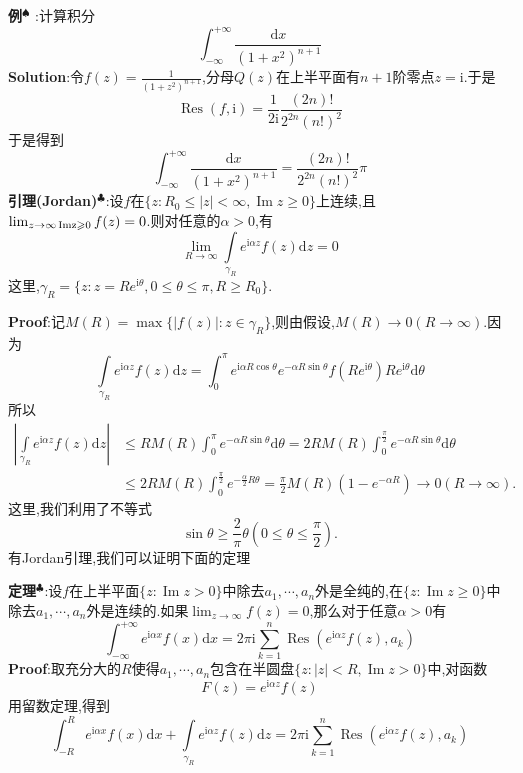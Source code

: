 \qquad \textbf{例}$^\spadesuit$ :计算积分
$$
\int_{-\infty}^{+\infty}\frac{\mathrm{d}x}{(1+x^2)^{n+1}}
$$
\qquad \textbf{Solution}:令$f(z)=\frac{1}{(1+z^2)^{n+1}}$,分母$Q(z)$在上半平面有$n+1$阶零点$z=\mathrm{i}$.于是
$$
\operatorname{Res}(f,\mathrm{i})=\frac{1}{2\mathrm{i}}\frac{(2n)!}{2^{2n}(n!)^2}
$$
于是得到
$$
\int_{-\infty}^{+\infty}\frac{\mathrm{d}x}{(1+x^2)^{n+1}}=\frac{(2n)!}{2^{2n}(n!)^2}\pi
$$
\qquad \textbf{引理(Jordan)}$^\clubsuit$:设$f$在$\{z:R_0\leqslant|z|<\infty,\operatorname{Im}z\geqslant 0\}$上连续,且$\lim_{z\to\infty\\\operatorname{Im z\geqslant 0}}f(z)=0$.则对任意的$\alpha>0$,有
$$
\lim_{R\to\infty}\int\limits_{\gamma_R}e^{\mathrm{i}\alpha z}f(z)\mathrm{d}z=0
$$
这里,$\gamma_R=\{z:z=Re^{\mathrm{i}\theta},0\leqslant\theta\leqslant \pi,R\geqslant R_0\}$.\par
\textbf{Proof}:记$M(R) = \max\{|f(z)|: z \in \gamma_R\}$,则由假设,$M(R) \to 0 (R \to \infty)$.因为
$$
\int\limits_{\gamma_R} e^{\mathrm{i}\alpha z} f(z) \mathrm{d}z = \int_0^\pi e^{\mathrm{i}\alpha R \cos\theta} e^{-\alpha R \sin\theta} f(R e^{\mathrm{i}\theta}) R e^{\mathrm{i}\theta} \mathrm{d}\theta
$$
所以
$$
\begin{aligned}
    \left|\int\limits_{\gamma_R} e^{\mathrm{i}\alpha z} f(z) \mathrm{d}z\right| &\leqslant R M(R) \int_0^\pi e^{-\alpha R \sin\theta} \mathrm{d}\theta = 2 R M(R) \int_0^{\frac{\pi}{2}} e^{-\alpha R \sin\theta} \mathrm{d}\theta\\
                                                                         &\leqslant 2 R M(R) \int_0^{\frac{\pi}{2}} e^{-\frac{\alpha}{2} R \theta} = \frac{\pi}{2} M(R) (1 - e^{-\alpha R}) \to 0 (R \to \infty).
\end{aligned}
$$
这里,我们利用了不等式
$$
\sin\theta \geqslant \frac{2}{\pi} \theta \left(0 \leqslant \theta \leqslant \frac{\pi}{2}\right).
$$
有Jordan引理,我们可以证明下面的定理\par
\textbf{定理}$^\clubsuit$:设$f$在上半平面$\{z:\operatorname{Im}z>0\}$中除去$a_1,\cdots,a_n$外是全纯的,在$\{z:\operatorname{Im}z\geqslant 0\}$中除去$a_1,\cdots,a_n$外是连续的.如果$\lim_{z\to \infty}f(z)=0$,那么对于任意$\alpha>0$有
$$
\int_{-\infty}^{+\infty}e^{\mathrm{i}\alpha x}f(x)\mathrm{d}x=2\pi\mathrm{i}\sum^n_{k=1}\operatorname{Res}(e^{\mathrm{i}\alpha z}f(z),a_k)
$$
\qquad \textbf{Proof}:取充分大的$R$使得$a_1,\cdots,a_n$包含在半圆盘$\{z:|z|<R,\operatorname{Im}z>0\}$中,对函数
$$
F(z)=e^{\mathrm{i}\alpha z}f(z)
$$
用留数定理,得到
$$
\int^R_{-R}e^{\mathrm{i}\alpha x}f(x)\mathrm{d}x+\int\limits_{\gamma_R}e^{\mathrm{i}\alpha z}f(z)\mathrm{d}z=2\pi\mathrm{i}\sum^n_{k=1}\operatorname{Res}(e^{\mathrm{i}\alpha z}f(z),a_k)
$$
